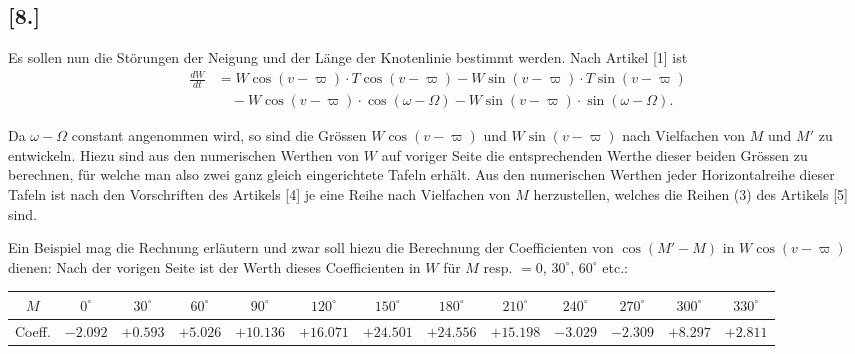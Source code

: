 \documentclass[12pt,a4paper]{article}
\begin{document}
\normalsize

\subsection*{[8.]}

Es sollen nun die Störungen der Neigung und der Länge der Knotenlinie bestimmt werden. Nach Artikel [1] ist
\begin{align*}
\frac{dW}{dt} &= W \cos(v-\varpi) \cdot T \cos(v-\varpi) - W \sin(v-\varpi) \cdot T \sin(v-\varpi) \\
&\quad - W \cos(v-\varpi) \cdot \cos(\omega-\Omega) - W \sin(v-\varpi) \cdot \sin(\omega-\Omega).
\end{align*}

Da $\omega-\Omega$ constant angenommen wird, so sind die Grössen $W \cos(v-\varpi)$ und $W \sin(v-\varpi)$ nach Vielfachen von $M$ und $M'$ zu entwickeln. Hiezu sind aus den numerischen Werthen von $W$ auf voriger Seite die entsprechenden Werthe dieser beiden Grössen zu berechnen, für welche man also zwei ganz gleich eingerichtete Tafeln erhält. Aus den numerischen Werthen jeder Horizontalreihe dieser Tafeln ist nach den Vorschriften des Artikels [4] je eine Reihe nach Vielfachen von $M$ herzustellen, welches die Reihen (3) des Artikels [5] sind.

Ein Beispiel mag die Rechnung erläutern und zwar soll hiezu die Berechnung der Coefficienten von $\cos(M'-M)$ in $W \cos(v-\varpi)$ dienen: Nach der vorigen Seite ist der Werth dieses Coefficienten in $W$ für $M$ resp. $= 0$, $30^{\circ}$, $60^{\circ}$ etc.:
\begin{center}
\begin{tabular}{@{}c|cccccccccccc@{}}
$M$ & $0^{\circ}$ & $30^{\circ}$ & $60^{\circ}$ & $90^{\circ}$ & $120^{\circ}$ & $150^{\circ}$ & $180^{\circ}$ & $210^{\circ}$ & $240^{\circ}$ & $270^{\circ}$ & $300^{\circ}$ & $330^{\circ}$\\
\midrule
Coeff. & $-2.092$ & $+0.593$ & $+5.026$ & $+10.136$ & $+16.071$ & $+24.501$ & $+24.556$ & $+15.198$ & $-3.029$ & $-2.309$ & $+8.297$ & $+2.811$
\end{tabular}
\end{center}
\end{document}
